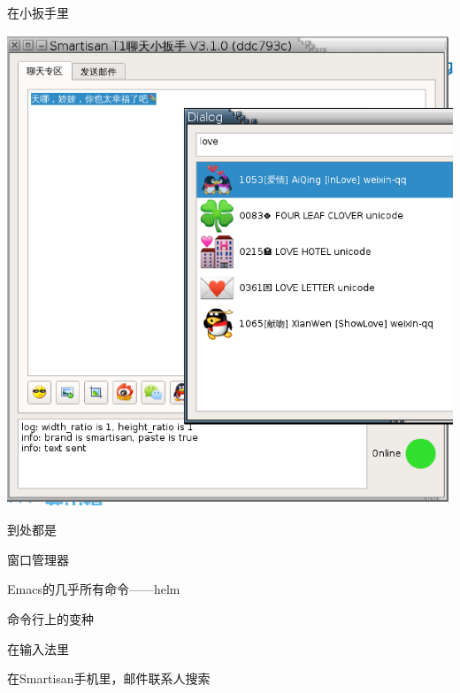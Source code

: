 \documentclass[presentation,dvipdfmx,CJKbookmarks]{beamer}
\begin{document}
\begin{CJK*}{UTF8}{simsun}
\begin{frame}[label={sec:orgdc9eddf}]{在小扳手里}
\begin{center}
\includegraphics[width=.9\linewidth]{./images/wrench-ui.ps}
\end{center}
\end{frame}

\begin{frame}[label={sec:org9e5adc6}]{到处都是}
\begin{block}{窗口管理器}
\end{block}
\begin{block}{Emacs的几乎所有命令——helm}
\end{block}
\begin{block}{命令行上的变种}
\end{block}
\begin{block}{在输入法里}
\end{block}
\begin{block}{在Smartisan手机里，邮件联系人搜索}
\end{block}
\end{frame}


\end{CJK*}
\end{document}
